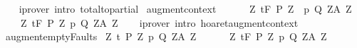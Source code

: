 \begin{isabellebody}
%
\isadelimproof
\ \ %
\endisadelimproof
%
\isatagproof
{}\isamarkupfalse%
\ {\isacharparenleft}iprover\ intro{\isacharcolon}\ total{\isacharunderscore}to{\isacharunderscore}partial{\isacharparenright}%
\endisatagproof
{\isafoldproof}%
%
\isadelimproof
\isanewline
%
\endisadelimproof
\isanewline
{}\isamarkupfalse%
\ augment{\isacharunderscore}context{\isacharprime}{\isacharcolon}\ \isanewline
\ \ {\isachardoublequoteopen}{\isasymlbrakk}{\isasymTheta}\ {\isasymsubseteq}\ {\isasymTheta}{\isacharprime}{\isacharsemicolon}\ {\isasymforall}Z{\isachardot}\ {\isasymGamma}{\isacharcomma}{\isasymTheta}{\isasymturnstile}\isactrlsub t\isactrlbsub {\isacharslash}F\isactrlesub \ {\isacharparenleft}P\ Z{\isacharparenright}\ \ p\ {\isacharparenleft}Q\ Z{\isacharparenright}{\isacharcomma}{\isacharparenleft}A\ Z{\isacharparenright}{\isasymrbrakk}\ \isanewline
\ \ \ {\isasymLongrightarrow}\ {\isasymforall}Z{\isachardot}\ {\isasymGamma}{\isacharcomma}{\isasymTheta}{\isacharprime}{\isasymturnstile}\isactrlsub t\isactrlbsub {\isacharslash}F\isactrlesub \ {\isacharparenleft}P\ Z{\isacharparenright}\ p\ {\isacharparenleft}Q\ Z{\isacharparenright}{\isacharcomma}{\isacharparenleft}A\ Z{\isacharparenright}{\isachardoublequoteclose}\isanewline
%
\isadelimproof
\ \ %
\endisadelimproof
%
\isatagproof
{}\isamarkupfalse%
\ {\isacharparenleft}iprover\ intro{\isacharcolon}\ hoaret{\isacharunderscore}augment{\isacharunderscore}context{\isacharparenright}%
\endisatagproof
{\isafoldproof}%
%
\isadelimproof
\isanewline
%
\endisadelimproof
\isanewline
\isanewline
{}\isamarkupfalse%
\ augment{\isacharunderscore}emptyFaults{\isacharcolon}\isanewline
\ {\isachardoublequoteopen}{\isasymlbrakk}{\isasymforall}Z{\isachardot}\ {\isasymGamma}{\isacharcomma}{\isacharbraceleft}{\isacharbraceright}{\isasymturnstile}\isactrlsub t\isactrlbsub {\isacharslash}{\isacharbraceleft}{\isacharbraceright}\isactrlesub \ {\isacharparenleft}P\ Z{\isacharparenright}\ p\ {\isacharparenleft}Q\ Z{\isacharparenright}{\isacharcomma}{\isacharparenleft}A\ Z{\isacharparenright}{\isasymrbrakk}\ {\isasymLongrightarrow}\ \isanewline
\ \ \ \ {\isasymforall}Z{\isachardot}\ {\isasymGamma}{\isacharcomma}{\isacharbraceleft}{\isacharbraceright}{\isasymturnstile}\isactrlsub t\isactrlbsub {\isacharslash}F\isactrlesub \ {\isacharparenleft}P\ Z{\isacharparenright}\ p\ {\isacharparenleft}Q\ Z{\isacharparenright}{\isacharcomma}{\isacharparenleft}A\ Z{\isacharparenright}{\isachardoublequoteclose}\isanewline
%
\isadelimproof
\ \ %
\endisadelimproof
%
\isatagproof
{}\isamarkupfalse%

\end{isabellebody}

